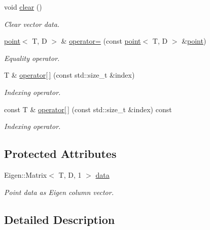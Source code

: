 \begin{DoxyCompactItemize}
\mbox{\label{classacme_1_1point_a72a37be7ec9417b12eeec1a31ed0398b}} 
void \hyperlink{classacme_1_1point_a72a37be7ec9417b12eeec1a31ed0398b}{clear} ()
\begin{DoxyCompactList}\small\item\em Clear vector data. \end{DoxyCompactList}\item 
\hyperlink{classacme_1_1point}{point}$<$ T, D $>$ \& \hyperlink{classacme_1_1point_a86eae9e4a5cca7bb30cdc26a745e75c2}{operator=} (const \hyperlink{classacme_1_1point}{point}$<$ T, D $>$ \&\hyperlink{classacme_1_1point}{point})
\begin{DoxyCompactList}\small\item\em Equality operator. \end{DoxyCompactList}\item 
T \& \hyperlink{classacme_1_1point_ac8fee17f41cb01f10ecb082921018155}{operator\mbox{[}$\,$\mbox{]}} (const std\+::size\+\_\+t \&index)
\begin{DoxyCompactList}\small\item\em Indexing operator. \end{DoxyCompactList}\item 
const T \& \hyperlink{classacme_1_1point_a5e3a5ca9538fcdb337127d27fcecc2b6}{operator\mbox{[}$\,$\mbox{]}} (const std\+::size\+\_\+t \&index) const
\begin{DoxyCompactList}\small\item\em Indexing operator. \end{DoxyCompactList}\end{DoxyCompactItemize}
\subsection*{Protected Attributes}
\begin{DoxyCompactItemize}
\item 
\mbox{\label{classacme_1_1point_a7532a61c7031fddbef1ea217cd916c4c}} 
Eigen\+::\+Matrix$<$ T, D, 1 $>$ \hyperlink{classacme_1_1point_a7532a61c7031fddbef1ea217cd916c4c}{data}
\begin{DoxyCompactList}\small\item\em Point data as Eigen column vector. \end{DoxyCompactList}\end{DoxyCompactItemize}


\subsection{Detailed Description}

